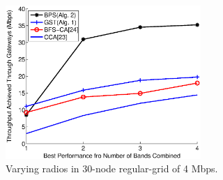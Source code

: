 \begin{figure}
\centering
\includegraphics[width=74mm]{figures/varyradios}
\vspace{-0.1in}
\caption{Varying radios in 30-node regular-grid of 4 Mbps.}                                                                               
\label{fig:varyradios}
\end{figure}





